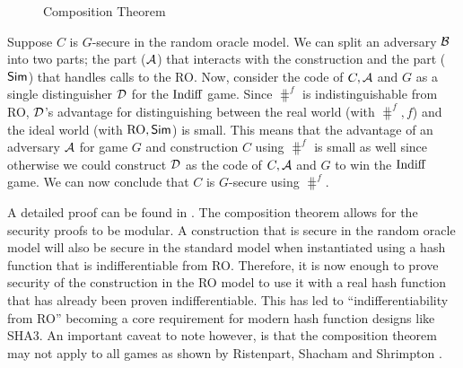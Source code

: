 \begin{figure}[h]
  
    \caption{Composition Theorem}
    \label{fig:indiff composition}
\end{figure}


\begin{proofsketch}
Suppose $C$ is $G$-secure in the random oracle model. We can split an adversary ${\mathcal B}$ into two parts; the part (${\mathcal A}$) that interacts with the construction and the part ($\textsf{Sim}$) that handles calls to the RO. Now, consider the code of $C, {\mathcal A}$ and $G$ as a single distinguisher ${\mathcal D}$ for the $\textnormal{Indiff}$ game. Since $\hash^f$ is indistinguishable from RO, ${\mathcal D}$'s advantage for distinguishing between the real world (with $\hash^f, f$) and the ideal world (with $\textnormal{RO}, \textsf{Sim}$) is small. This means that the advantage of an adversary ${\mathcal A}$ for game $G$ and construction $C$ using $\hash^f$ is small as well since otherwise we could construct ${\mathcal D}$ as the code of $C, {\mathcal A}$ and $G$ to win the $\textnormal{Indiff}$ game.
We can now conclude that $C$ is $G$-secure using $\hash^f$.
\end{proofsketch}

A detailed proof can be found in \cite{Maurer2004}. The composition theorem allows for the security proofs to be modular. A construction that is secure in the random oracle model will also be secure in the standard model when instantiated using a hash function that is indifferentiable from RO. Therefore, it is now enough to prove security of the construction in the RO model to use it with a real hash function that has already been proven indifferentiable. This has led to ``indifferentiability from RO'' becoming a core requirement for modern hash function designs like SHA3. An important caveat to note however, is that the composition theorem may not apply to all games as shown by Ristenpart, Shacham and Shrimpton \cite{Ristenpart2011}. 



